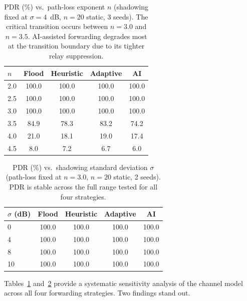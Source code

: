 \documentclass[conference]{IEEEtran}
\begin{document}
\begin{table}[!t]
  \centering
  \caption{PDR (\%) vs.\ path-loss exponent $n$ (shadowing fixed at
           $\sigma=4$~dB, $n=20$ static, 3 seeds).  The critical transition
           occurs between $n=3.0$ and $n=3.5$.  AI-assisted forwarding degrades
           most at the transition boundary due to its tighter relay suppression.}
  \label{tab:channel_pl}
  \begin{tabular}{lcccc}
    \toprule
    $n$ & \textbf{Flood} & \textbf{Heuristic} & \textbf{Adaptive} & \textbf{AI} \\
    \midrule
    2.0 & 100.0 & 100.0 & 100.0 & 100.0 \\
    2.5 & 100.0 & 100.0 & 100.0 & 100.0 \\
    3.0 & 100.0 & 100.0 & 100.0 & 100.0 \\
    3.5 & 84.9  & 78.3  & 83.2  & 74.2  \\
    4.0 & 21.0  & 18.1  & 19.0  & 17.4  \\
    4.5 &  8.0  &  7.2  &  6.7  &  6.0  \\
    \bottomrule
  \end{tabular}
\end{table}

\begin{table}[!t]
  \centering
  \caption{PDR (\%) vs.\ shadowing standard deviation $\sigma$ (path-loss
           fixed at $n=3.0$, $n=20$ static, 2 seeds).  PDR is stable across
           the full range tested for all four strategies.}
  \label{tab:channel_sh}
  \begin{tabular}{lcccc}
    \toprule
    $\sigma$ (dB) & \textbf{Flood} & \textbf{Heuristic} & \textbf{Adaptive} & \textbf{AI} \\
    \midrule
    0  & 100.0 & 100.0 & 100.0 & 100.0 \\
    4  & 100.0 & 100.0 & 100.0 & 100.0 \\
    8  & 100.0 & 100.0 & 100.0 & 100.0 \\
    10 & 100.0 & 100.0 & 100.0 & 100.0 \\
    \bottomrule
  \end{tabular}
\end{table}

Tables~\ref{tab:channel_pl} and~\ref{tab:channel_sh} provide a systematic
sensitivity analysis of the channel model across all four forwarding strategies.
Two findings stand out.
\end{document}
